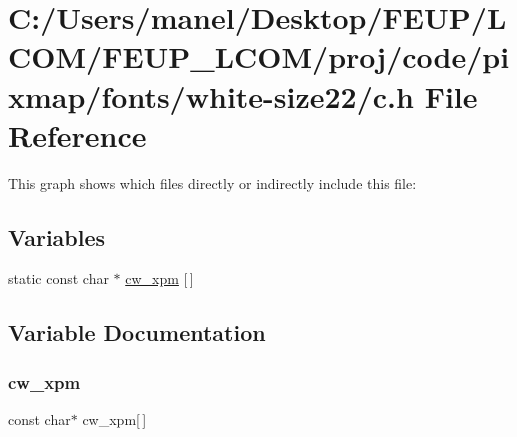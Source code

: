 \hypertarget{white-size22_2c_8h}{}\section{C\+:/\+Users/manel/\+Desktop/\+F\+E\+U\+P/\+L\+C\+O\+M/\+F\+E\+U\+P\+\_\+\+L\+C\+O\+M/proj/code/pixmap/fonts/white-\/size22/c.h File Reference}
\label{white-size22_2c_8h}
This graph shows which files directly or indirectly include this file\+:
\subsection*{Variables}
\begin{DoxyCompactItemize}
\item 
static const char $\ast$ \mbox{\hyperlink{white-size22_2c_8h_a4449d5d8d2b69e0bae143b16beb91382}{cw\+\_\+xpm}} \mbox{[}$\,$\mbox{]}
\end{DoxyCompactItemize}


\subsection{Variable Documentation}
\mbox{\label{white-size22_2c_8h_a4449d5d8d2b69e0bae143b16beb91382}} 
\subsubsection{\texorpdfstring{cw\_xpm}{cw\_xpm}}
{\footnotesize\ttfamily const char$\ast$ cw\+\_\+xpm\mbox{[}$\,$\mbox{]}\hspace{0.3cm}{\ttfamily [static]}}

